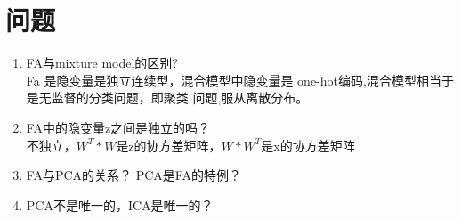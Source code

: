 \section{问题}
\begin{enumerate}
\item FA与mixture model的区别?\\
Fa 是隐变量是独立连续型，混合模型中隐变量是
one-hot编码,混合模型相当于是无监督的分类问题，即聚类
问题,服从离散分布。
\item FA中的隐变量z之间是独立的吗？\\
不独立，$W^T*W$是z的协方差矩阵，$W*W^T$是x的协方差矩阵
\item FA与PCA的关系？
PCA是FA的特例？
\item PCA不是唯一的，ICA是唯一的？
\end{enumerate}


